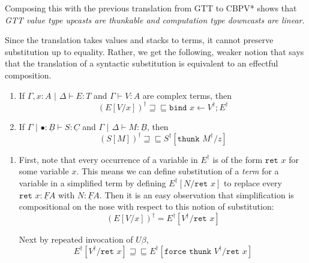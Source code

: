 \documentclass[acmsmall,screen,12pt]{acmart}
\renewcommand{\u}{\underline}
\newcommand{\cbpvstar}{CBPV*}
\newcommand{\pipe}{\,\,|\,\,}
\newcommand{\ltdyn}{\sqsubseteq}
\newcommand{\gtdyn}{\sqsupseteq}
\newcommand{\equidyn}{\mathrel{\gtdyn\ltdyn}}
\newcommand{\simp}[1]{{#1}^{\dag}}
\newcommand{\simpp}[1]{\simp{({#1})}}
\newcommand{\bindXtoYinZ}[2]{\kw{bind}#2 \leftarrow #1;}
\newcommand{\kw}[1]{\texttt{#1}\,\,}
\newcommand{\ret}{\kw{ret}}
\newcommand{\thunk}{\kw{thunk}}
\newcommand{\force}{\kw{force}}
\begin{document}
{\begin{longonly}
Composing this with the previous translation from GTT to \cbpvstar\/
shows that \emph{GTT value type upcasts are thunkable and computation
  type downcasts are linear}.

Since the translation takes values and stacks to terms, it cannot
preserve substitution up to equality.
%
Rather, we get the following, weaker notion that says that the
translation of a syntactic substitution is equivalent to an effectful
composition.
\begin{lemma}
  \begin{enumerate}
  \item If $\Gamma, x : A\pipe \Delta\vdash E : T$ and $\Gamma \vdash V : A$
    are complex terms, then
    \[ 
    \simpp{E[V/x]} \equidyn \bindXtoYinZ {\simp V} x {\simp E}
    \]
  \item If $\Gamma \pipe \bullet : \u B \vdash S : \u C$ and $\Gamma
    \pipe \Delta \vdash M : \u B$, then
    \[
    \simpp{S[M]} \equidyn \simp{S}[\thunk\simp{M}/z]
    \]
  \end{enumerate}
\end{lemma}
\begin{longproof}
  \begin{enumerate}
  \item   First, note that every occurrence of a variable in $\simp E$ is of
  the form $\ret x$ for some variable $x$. This means we can define
  substitution of a \emph{term} for a variable in a simplified term by
  defining $\simp{E}[N/\ret x]$ to replace every $\ret x : \u F A$
  with $N : \u F A$. Then it is an easy observation that
  simplification is compositional on the nose with respect to this
  notion of substitution:
  \[ \simpp{E[V/x]} = \simp{E}[\simp V / \ret x] \]

  Next by repeated invocation of $U\beta$,
  \[ \simp{E}[\simp V/\ret x] \equidyn \simp{E}[\force\thunk\simp V/\ret x] \]


\end{enumerate}
\end{longproof}
\end{longonly}}
\end{document}
